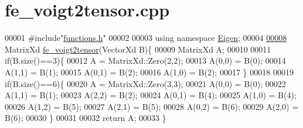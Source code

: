 \hypertarget{fe__voigt2tensor_8cpp_source}{}\section{fe\+\_\+voigt2tensor.\+cpp}
\label{fe__voigt2tensor_8cpp_source}

\begin{DoxyCode}
00001 \textcolor{preprocessor}{#include"\hyperlink{functions_8h}{functions.h}"}
00002 
00003 \textcolor{keyword}{using namespace }\hyperlink{namespace_eigen}{Eigen};
00004 
\hyperlink{fe__voigt2tensor_8cpp_a721a169d6a3d34b5584817ccd1c48cd7}{00008} MatrixXd \hyperlink{fe__voigt2tensor_8cpp_a721a169d6a3d34b5584817ccd1c48cd7}{fe\_voigt2tensor}(VectorXd B)\{
00009   MatrixXd A;
00010 
00011   \textcolor{keywordflow}{if}(B.size()==3)\{
00012     A = MatrixXd::Zero(2,2);
00013     A(0,0) = B(0);
00014     A(1,1) = B(1);
00015     A(0,1) = B(2);
00016     A(1,0) = B(2);
00017   \}
00018 
00019   \textcolor{keywordflow}{if}(B.size()==6)\{
00020     A = MatrixXd::Zero(3,3);
00021     A(0,0) = B(0);
00022     A(1,1) = B(1);
00023     A(2,2) = B(2);
00024     A(0,1) = B(4);
00025     A(1,0) = B(4);
00026     A(1,2) = B(5);
00027     A(2,1) = B(5);
00028     A(0,2) = B(6);
00029     A(2,0) = B(6);
00030   \}
00031 
00032   \textcolor{keywordflow}{return} A;
00033 \}
\end{DoxyCode}

